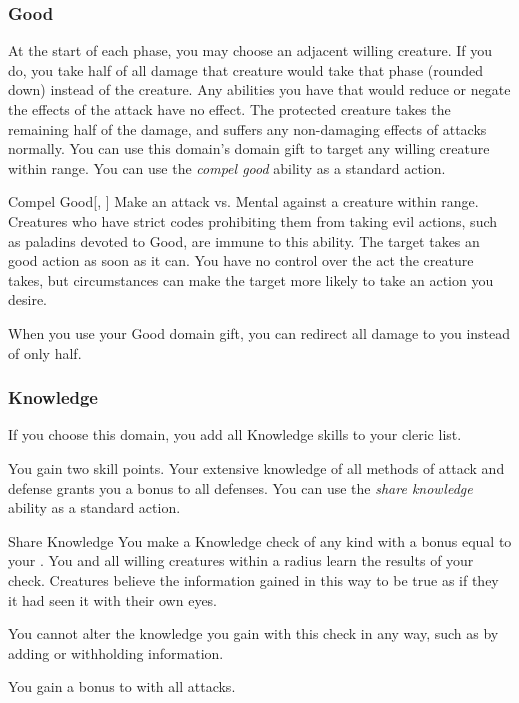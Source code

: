         \subsubsection{Good}
             At the start of each phase, you may choose an adjacent willing creature.
            If you do, you take half of all damage that creature would take that phase (rounded down) instead of the creature.
            Any abilities you have that would reduce or negate the effects of the attack have no effect.
            The protected creature takes the remaining half of the damage, and suffers any non-damaging effects of attacks normally.
             You can use this domain's domain gift to target any willing creature within \rngclose range.
             You can use the \textit{compel good} ability as a standard action.
            \begin{apability}{Compel Good}[, ]
                Make an attack vs. Mental against a creature within \rngmed range.
                Creatures who have strict codes prohibiting them from taking evil actions, such as paladins devoted to Good, are immune to this ability.
                \hit The target takes an good action as soon as it can.
                You have no control over the act the creature takes, but circumstances can make the target more likely to take an action you desire.
            \end{apability}
             When you use your Good domain gift, you can redirect all damage to you instead of only half.

        \subsubsection{Knowledge}
            If you choose this domain, you add all Knowledge skills to your cleric  list.

             You gain two skill points.
             Your extensive knowledge of all methods of attack and defense grants you a  bonus to all defenses.
             You can use the \textit{share knowledge} ability as a standard action.
            \begin{apability}{Share Knowledge}
                You make a Knowledge check of any kind with a bonus equal to your .
                You and all willing creatures within a \arealarge radius learn the results of your check.
                Creatures believe the information gained in this way to be true as if they it had seen it with their own eyes.

                You cannot alter the knowledge you gain with this check in any way, such as by adding or withholding information.
            \end{apability}
             You gain a  bonus to  with all attacks.

